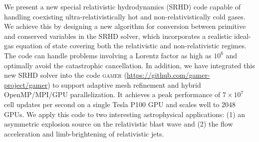 \begin{abstracten}
We present a new special relativistic hydrodynamics (SRHD) code capable of handling coexisting
ultra-relativistically hot and non-relativistically cold gases.
We achieve this by designing a new algorithm for conversion between primitive and
conserved variables in the SRHD solver, which incorporates a realistic ideal-gas
equation of state covering both the relativistic and non-relativistic regimes.
The code can handle problems involving a Lorentz factor as high as $10^6$ and optimally
avoid the catastrophic cancellation. In addition, we have integrated this new SRHD solver
into the code \textsc{gamer} (\url{https://github.com/gamer-project/gamer}) to support
adaptive mesh refinement and hybrid OpenMP/MPI/GPU parallelization.
It achieves a peak performance of $7\times 10^{7}$ cell updates per second on a
single Tesla P100 GPU and scales well to 2048 GPUs. We apply this code
to two interesting astrophysical applications: (1) an asymmetric explosion source
on the relativistic blast wave and (2) the flow acceleration and limb-brightening of
relativistic jets.


\end{abstracten}
